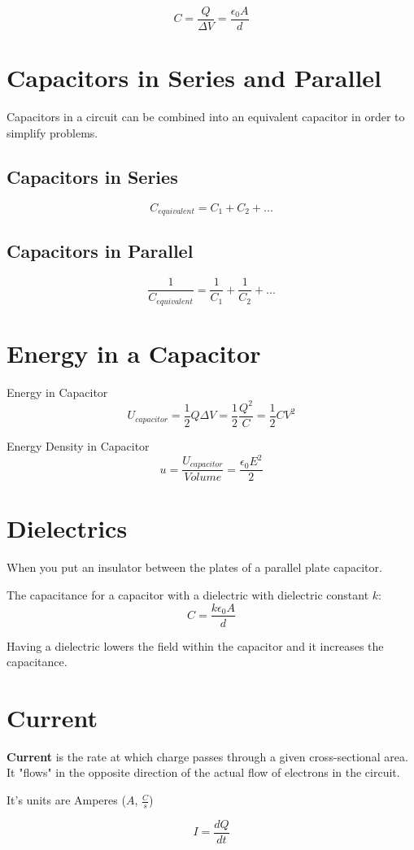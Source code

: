 \documentclass[10pt, a4paper, twocolumn]{article}
\begin{document}
    $$C = \frac{Q}{\Delta V} = \frac{\epsilon_0 A}{d}$$ 


    \section{Capacitors in Series and Parallel}	
        Capacitors in a circuit can be combined into an equivalent capacitor in order to simplify problems.
        \subsection{Capacitors in Series}
        $$C_{equivalent} = C_1 + C_2 + ...$$
        \subsection{Capacitors in Parallel}
        $$\frac{1}{C_{equivalent}} = \frac{1}{C_1} + \frac{1}{C_2} + ...$$
    \section{Energy in a Capacitor}	
        Energy in Capacitor
        $$U_{capacitor} = \frac{1}{2}Q \Delta V = \frac{1}{2} \frac{Q^2}{C} = \frac{1}{2} C V^2$$

        Energy Density in Capacitor
        $$u = \frac{U_{capacitor}}{Volume} = \frac{\epsilon_0 E^2}{2}$$
    \section{Dielectrics}	
        When you put an insulator between the plates of a parallel plate capacitor.

        The capacitance for a capacitor with a dielectric with dielectric constant $k$:
        $$C = \frac{k \epsilon_0 A}{d}$$

        Having a dielectric lowers the field within the capacitor and it increases the capacitance.
    \section{Current}	
        \textbf{Current} is the rate at which charge passes through a given cross-sectional area. It "flows" in the opposite direction of the actual flow of electrons in the circuit.

        It's units are Amperes ($A$, $\frac{C}{s}$)

        $$I = \frac{dQ}{dt}$$
\end{document}
